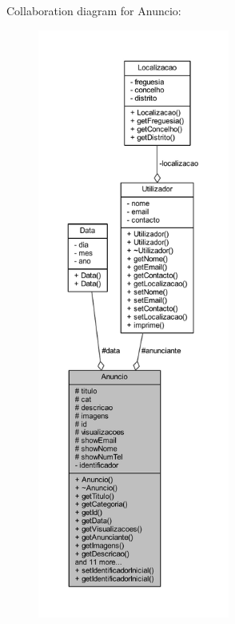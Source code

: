 Collaboration diagram for Anuncio\+:
\nopagebreak
\begin{figure}[H]
\begin{center}
\leavevmode
\includegraphics[height=550pt]{class_anuncio__coll__graph}
\end{center}
\end{figure}
